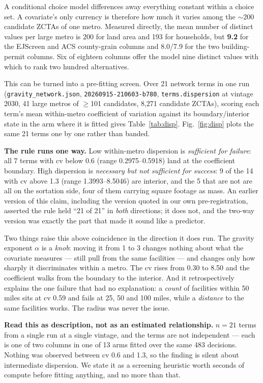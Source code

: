 \documentclass[conference]{IEEEtran}
\begin{document}
A conditional choice model differences away everything constant within a
choice set. A covariate's only currency is therefore how much it varies among
the $\sim$200 candidate ZCTAs of one metro. Measured directly, the mean number
of distinct values per large metro is 200 for land area and 193 for households,
but \textbf{9.2} for the EJScreen and ACS county-grain columns and 8.0/7.9 for
the two building-permit columns. Six of eighteen columns offer the model nine
distinct values with which to rank two hundred alternatives.

This can be turned into a pre-fitting screen. Over 21 network terms in one run
(\texttt{gravity\_network.json}, \texttt{20260915-210603-b780},
\texttt{terms.dispersion} at vintage 2030, 41 large metros of $\geq$101
candidates, 8{,}271 candidate ZCTAs), scoring each term's mean within-metro
coefficient of variation against its boundary/interior state in the arm where
it is fitted gives Table~\ref{tab:disp}. Fig.~\ref{fig:disp} plots the same 21
terms one by one rather than banded.

\textbf{The rule runs one way.} Low within-metro dispersion is
\emph{sufficient for failure}: all 7 terms with cv below 0.6 (range
0.2975--0.5918) land at the coefficient boundary. High dispersion is
\emph{necessary but not sufficient for success}: 9 of the 14 with cv above 1.3
(range 1.3993--8.5046) are interior, and the 5 that are not are all on the
sortation side, four of them carrying square footage as mass. An earlier
version of this claim, including the version quoted in our own
pre-registration, asserted the rule held ``21 of 21'' in \emph{both}
directions; it does not, and the two-way version was exactly the part that
made it sound like a predictor.

Two things raise this above coincidence in the direction it does run. The
gravity exponent $\alpha$ is a \emph{knob}: moving it from 1 to 3 changes
nothing about what the covariate measures --- still pull from the same
facilities --- and changes only how sharply it discriminates within a metro.
The cv rises from 0.30 to 8.50 and the coefficient walks from the boundary to
the interior. And it retrospectively explains the one failure that had no
explanation: a \emph{count} of facilities within 50 miles sits at cv 0.59 and
fails at 25, 50 and 100 miles, while a \emph{distance} to the same facilities
works. The radius was never the issue.

\textbf{Read this as description, not as an estimated relationship.} $n=21$
terms from a single run at a single vintage, and the terms are not independent
--- each is one of two columns in one of 13 arms fitted over the same 483
decisions. Nothing was observed between cv 0.6 and 1.3, so the finding is
silent about intermediate dispersion. We state it as a screening heuristic
worth seconds of compute before fitting anything, and no more than that.
\end{document}
